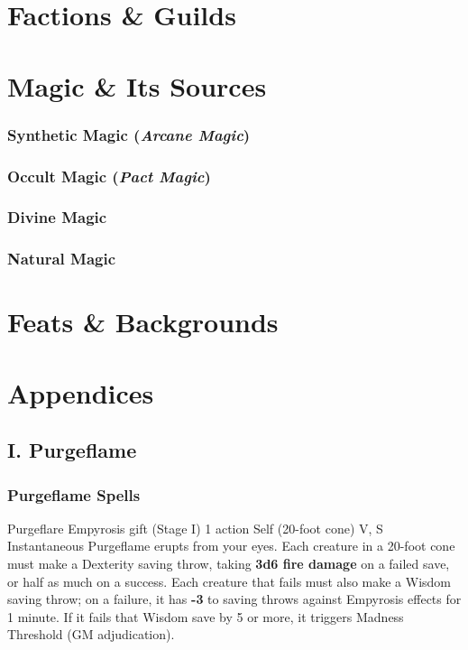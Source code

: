 \documentclass{apotheosis-book}
\begin{document}
\chapter{Factions \& Guilds}



\chapter{Magic \& Its Sources}

\subsection{Synthetic Magic (\textit{Arcane Magic})} 

\subsection{Occult Magic (\textit{Pact Magic})}

\subsection{Divine Magic}

\subsection{Natural Magic}

\chapter{Feats \& Backgrounds}

\chapter*{Appendices}

\section{I. Purgeflame}
\subsection{Purgeflame Spells}

\DndSpellHeader%
  {Purgeflare}
  {Empyrosis gift (Stage I)}
  {1 action}
  {Self (20-foot cone)}
  {V, S}
  {Instantaneous}
Purgeflame erupts from your eyes. Each creature in a 20-foot cone must make a Dexterity saving throw, taking \textbf{3d6 fire damage} on a failed save, or half as much on a success. Each creature that fails must also make a Wisdom saving throw; on a failure, it has \textbf{-3} to saving throws against Empyrosis effects for 1 minute. If it fails that Wisdom save by 5 or more, it triggers Madness Threshold (GM adjudication).
\end{document}
